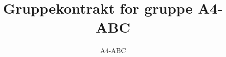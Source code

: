 \documentclass[a4paper,12pt,hidelinks]{article}
\newcommand{\group}{A4-ABC}
\begin{document}
	\title{Gruppekontrakt for gruppe \group}
	\author{\group}
	\maketitle
\end{document}
